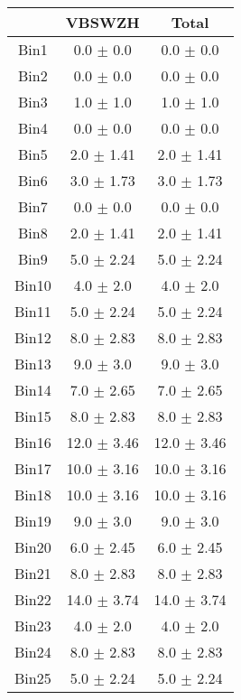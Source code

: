   \begin{tabular}{|c|c|c|}
  \hline
      & VBSWZH & Total \\ \cline{1-3} 
     \hline\hline
     Bin1 & 0.0 $\pm$ 0.0 & 0.0 $\pm$ 0.0 \\ \cline{1-3} 
     Bin2 & 0.0 $\pm$ 0.0 & 0.0 $\pm$ 0.0 \\ \cline{1-3} 
     Bin3 & 1.0 $\pm$ 1.0 & 1.0 $\pm$ 1.0 \\ \cline{1-3} 
     Bin4 & 0.0 $\pm$ 0.0 & 0.0 $\pm$ 0.0 \\ \cline{1-3} 
     Bin5 & 2.0 $\pm$ 1.41 & 2.0 $\pm$ 1.41 \\ \cline{1-3} 
     Bin6 & 3.0 $\pm$ 1.73 & 3.0 $\pm$ 1.73 \\ \cline{1-3} 
     Bin7 & 0.0 $\pm$ 0.0 & 0.0 $\pm$ 0.0 \\ \cline{1-3} 
     Bin8 & 2.0 $\pm$ 1.41 & 2.0 $\pm$ 1.41 \\ \cline{1-3} 
     Bin9 & 5.0 $\pm$ 2.24 & 5.0 $\pm$ 2.24 \\ \cline{1-3} 
     Bin10 & 4.0 $\pm$ 2.0 & 4.0 $\pm$ 2.0 \\ \cline{1-3} 
     Bin11 & 5.0 $\pm$ 2.24 & 5.0 $\pm$ 2.24 \\ \cline{1-3} 
     Bin12 & 8.0 $\pm$ 2.83 & 8.0 $\pm$ 2.83 \\ \cline{1-3} 
     Bin13 & 9.0 $\pm$ 3.0 & 9.0 $\pm$ 3.0 \\ \cline{1-3} 
     Bin14 & 7.0 $\pm$ 2.65 & 7.0 $\pm$ 2.65 \\ \cline{1-3} 
     Bin15 & 8.0 $\pm$ 2.83 & 8.0 $\pm$ 2.83 \\ \cline{1-3} 
     Bin16 & 12.0 $\pm$ 3.46 & 12.0 $\pm$ 3.46 \\ \cline{1-3} 
     Bin17 & 10.0 $\pm$ 3.16 & 10.0 $\pm$ 3.16 \\ \cline{1-3} 
     Bin18 & 10.0 $\pm$ 3.16 & 10.0 $\pm$ 3.16 \\ \cline{1-3} 
     Bin19 & 9.0 $\pm$ 3.0 & 9.0 $\pm$ 3.0 \\ \cline{1-3} 
     Bin20 & 6.0 $\pm$ 2.45 & 6.0 $\pm$ 2.45 \\ \cline{1-3} 
     Bin21 & 8.0 $\pm$ 2.83 & 8.0 $\pm$ 2.83 \\ \cline{1-3} 
     Bin22 & 14.0 $\pm$ 3.74 & 14.0 $\pm$ 3.74 \\ \cline{1-3} 
     Bin23 & 4.0 $\pm$ 2.0 & 4.0 $\pm$ 2.0 \\ \cline{1-3} 
     Bin24 & 8.0 $\pm$ 2.83 & 8.0 $\pm$ 2.83 \\ \cline{1-3} 
     Bin25 & 5.0 $\pm$ 2.24 & 5.0 $\pm$ 2.24 \\ \cline{1-3} 

\end{tabular}
